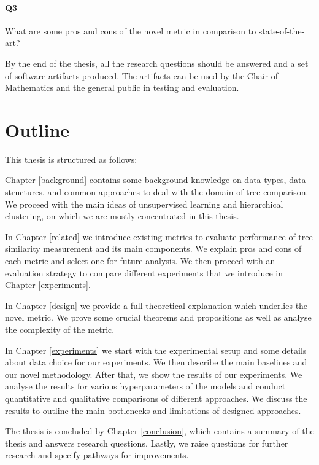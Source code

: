 \paragraph{Q3}
\label{q3}
What are some pros and cons of the novel metric in comparison to state-of-the-art?

By the end of the thesis, all the research questions should be answered and a set of software artifacts produced. The artifacts can be used by the Chair of Mathematics and the general public in testing and evaluation. 

\section{Outline}

This thesis is structured as follows:

Chapter \ref{background} contains some background knowledge on data types, data structures, and common approaches to deal with the domain of tree comparison. We proceed with the main ideas of unsupervised learning and hierarchical clustering, on which we are mostly concentrated in this thesis.

In Chapter \ref{related} we introduce existing metrics to evaluate performance of tree similarity measurement and its main components. We explain pros and cons of each metric and select one for future analysis. We then proceed with an evaluation strategy to compare different experiments that we introduce in Chapter \ref{experiments}.

In Chapter \ref{design} we provide a full theoretical explanation which underlies the novel metric. We prove some crucial theorems and propositions as well as analyse the complexity of the metric. 

In Chapter \ref{experiments} we start with the experimental setup and some details about data choice for our experiments. We then describe the main baselines and our novel methodology. After that, we show the results of our experiments. We analyse the results for various hyperparameters of the models and conduct quantitative and qualitative comparisons of different approaches. We discuss the results to outline the main bottlenecks and limitations of designed approaches. 

The thesis is concluded by Chapter \ref{conclusion}, which contains a summary of the thesis and answers research questions. 
Lastly, we raise questions for further research and specify pathways for improvements.